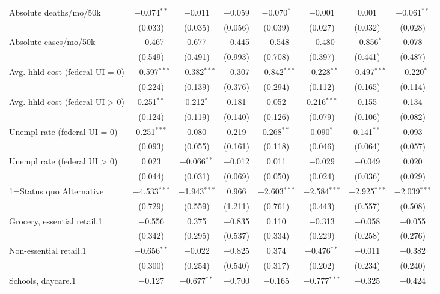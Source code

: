 \begin{table}[!htbp]
\begin{tabular}{@{\extracolsep{5pt}}lccccccc}
 Absolute deaths/mo/50k & $-$0.074$^{**}$ & $-$0.011 & $-$0.059 & $-$0.070$^{*}$ & $-$0.001 & 0.001 & $-$0.061$^{**}$ \\ 
  & (0.033) & (0.035) & (0.056) & (0.039) & (0.027) & (0.032) & (0.028) \\ 
  Absolute cases/mo/50k & $-$0.467 & 0.677 & $-$0.445 & $-$0.548 & $-$0.480 & $-$0.856$^{*}$ & 0.078 \\ 
  & (0.549) & (0.491) & (0.993) & (0.708) & (0.397) & (0.441) & (0.487) \\ 
  Avg. hhld cost (federal UI = 0) & $-$0.597$^{***}$ & $-$0.382$^{***}$ & $-$0.307 & $-$0.842$^{***}$ & $-$0.228$^{**}$ & $-$0.497$^{***}$ & $-$0.220$^{*}$ \\ 
  & (0.224) & (0.139) & (0.376) & (0.294) & (0.112) & (0.165) & (0.114) \\ 
  Avg. hhld cost (federal UI > 0) & 0.251$^{**}$ & 0.212$^{*}$ & 0.181 & 0.052 & 0.216$^{***}$ & 0.155 & 0.134 \\ 
  & (0.124) & (0.119) & (0.140) & (0.126) & (0.079) & (0.106) & (0.082) \\ 
  Unempl rate (federal UI = 0) & 0.251$^{***}$ & 0.080 & 0.219 & 0.268$^{**}$ & 0.090$^{*}$ & 0.141$^{**}$ & 0.093 \\ 
  & (0.093) & (0.055) & (0.161) & (0.118) & (0.046) & (0.064) & (0.057) \\ 
  Unempl rate (federal UI > 0) & 0.023 & $-$0.066$^{**}$ & $-$0.012 & 0.011 & $-$0.029 & $-$0.049 & 0.020 \\ 
  & (0.044) & (0.031) & (0.069) & (0.050) & (0.024) & (0.036) & (0.029) \\ 
  1=Status quo Alternative & $-$4.533$^{***}$ & $-$1.943$^{***}$ & 0.966 & $-$2.603$^{***}$ & $-$2.584$^{***}$ & $-$2.925$^{***}$ & $-$2.039$^{***}$ \\ 
  & (0.729) & (0.559) & (1.211) & (0.761) & (0.443) & (0.557) & (0.508) \\ 
  Grocery, essential retail.1 & $-$0.556 & 0.375 & $-$0.835 & 0.110 & $-$0.313 & $-$0.058 & $-$0.055 \\ 
  & (0.342) & (0.295) & (0.537) & (0.334) & (0.229) & (0.258) & (0.276) \\ 
  Non-essential retail.1 & $-$0.656$^{**}$ & $-$0.022 & $-$0.825 & 0.374 & $-$0.476$^{**}$ & $-$0.011 & $-$0.382 \\ 
  & (0.300) & (0.254) & (0.540) & (0.317) & (0.202) & (0.234) & (0.240) \\ 
  Schools, daycare.1 & $-$0.127 & $-$0.677$^{**}$ & $-$0.700 & $-$0.165 & $-$0.777$^{***}$ & $-$0.325 & $-$0.424 \\ 

\end{tabular}
\end{table}
